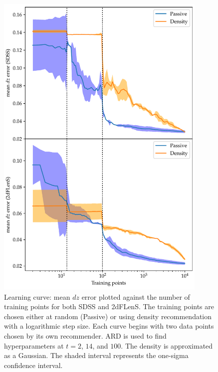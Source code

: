 \documentclass[11pt,twoside,openright]{report}
\begin{document}
  \begin{figure}
    \centering
    \includegraphics[width=0.9\textwidth]{density_dz1.pdf}
    \caption{Learning curve: mean $dz$ error plotted against the number of training points for both SDSS and 2dFLenS. The training points are chosen either at random (Passive) or using density recommendation with a logarithmic step size. Each curve begins with two data points chosen by its own recommender. ARD is used to find hyperparameters at $t=2$, $14$, and $100$. The density is approximated as a Gaussian. The shaded interval represents the one-sigma confidence interval.}
    \label{fig:density_dz1}
  \end{figure}
\end{document}
